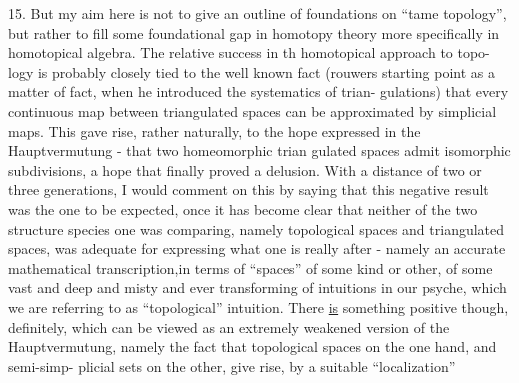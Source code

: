 15.  But my aim here is not to give an outline of foundations  on ``tame
topology'',  but rather to fill some foundational gap in homotopy theory\hand{,}
more specifically in homotopical algebra.
The relative success  in th   homotopical approach to topo-%
logy is probably closely tied to the well known fact (rouwers starting
point as a matter of fact,  when he introduced the systematics of trian-%
gulations)  that every continuous map between triangulated spaces can be
approximated by simplicial maps.  This gave rise,  rather naturally,  to
the hope expressed in the Hauptvermutung  -  that two homeomorphic trian%
gulated spaces admit isomorphic subdivisions,  a hope that finally proved
a delusion.  With a distance of two or three generations,  I would
comment on this by saying that this negative result was the one to be
expected,  once it has become clear that neither of the two structure
species one was comparing,  namely topological spaces and triangulated
spaces,  was adequate for expressing what one is really after  -  namely
an accurate mathematical transcription,in terms of ``spaces'' of some kind
or other, of some vast and deep and misty and ever transforming  of
intuitions in our psyche,  which we are referring to as ``topological''
\margin{\unsure{$\Pi$}}intuition. There \uline{is}  something positive though,  definitely,  which
can be viewed as an extremely weakened version of the Hauptvermutung,
namely the fact that topological spaces on the one hand,  and semi-simp-%
plicial sets on the other,  give rise,  by a suitable ``localization''
